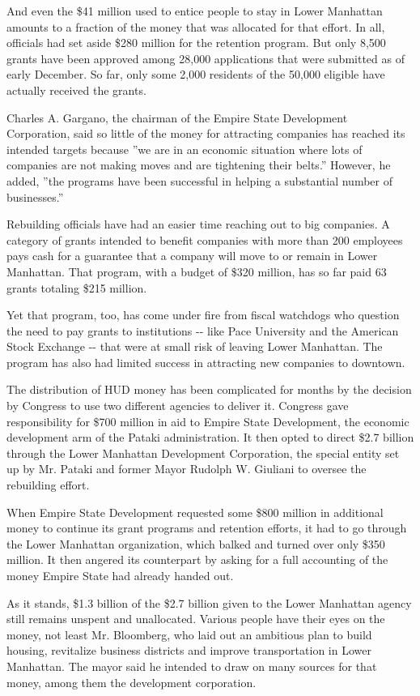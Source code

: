 And even the \$41 million used to entice people to stay in Lower
Manhattan amounts to a fraction of the money that was allocated for that
effort. In all, officials had set aside \$280 million for the retention
program. But only 8,500 grants have been approved among 28,000
applications that were submitted as of early December. So far, only some
2,000 residents of the 50,000 eligible have actually received the
grants.

Charles A. Gargano, the chairman of the Empire State Development
Corporation, said so little of the money for attracting companies has
reached its intended targets because ''we are in an economic situation
where lots of companies are not making moves and are tightening their
belts.'' However, he added, ''the programs have been successful in
helping a substantial number of businesses.''

Rebuilding officials have had an easier time reaching out to big
companies. A category of grants intended to benefit companies with more
than 200 employees pays cash for a guarantee that a company will move to
or remain in Lower Manhattan. That program, with a budget of \$320
million, has so far paid 63 grants totaling \$215 million.

Yet that program, too, has come under fire from fiscal watchdogs who
question the need to pay grants to institutions -\/- like Pace
University and the American Stock Exchange -\/- that were at small risk
of leaving Lower Manhattan. The program has also had limited success in
attracting new companies to downtown.

The distribution of HUD money has been complicated for months by the
decision by Congress to use two different agencies to deliver it.
Congress gave responsibility for \$700 million in aid to Empire State
Development, the economic development arm of the Pataki administration.
It then opted to direct \$2.7 billion through the Lower Manhattan
Development Corporation, the special entity set up by Mr. Pataki and
former Mayor Rudolph W. Giuliani to oversee the rebuilding effort.

When Empire State Development requested some \$800 million in additional
money to continue its grant programs and retention efforts, it had to go
through the Lower Manhattan organization, which balked and turned over
only \$350 million. It then angered its counterpart by asking for a full
accounting of the money Empire State had already handed out.

As it stands, \$1.3 billion of the \$2.7 billion given to the Lower
Manhattan agency still remains unspent and unallocated. Various people
have their eyes on the money, not least Mr. Bloomberg, who laid out an
ambitious plan to build housing, revitalize business districts and
improve transportation in Lower Manhattan. The mayor said he intended to
draw on many sources for that money, among them the development
corporation.

